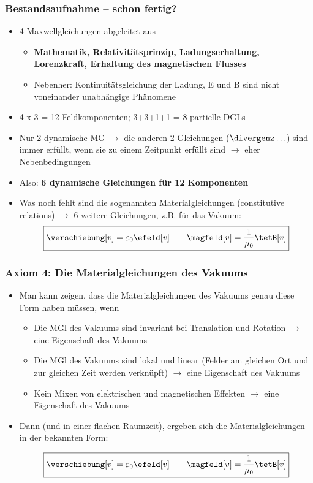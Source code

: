 \begin{frame}
  \frametitle{Bestandsaufnahme -- schon fertig?}
\begin{itemize}[<+->]
\item  4 Maxwellgleichungen abgeleitet aus
\begin{itemize}[<+->]
\item  \textbf{Mathematik, Relativitätsprinzip, Ladungserhaltung, Lorenzkraft, Erhaltung des magnetischen Flusses}
\item Nebenher: Kontinuitätsgleichung der Ladung, E und B sind nicht voneinander unabhängige Phänomene 
\end{itemize}
\item 4 x 3 = 12 Feldkomponenten; 3+3+1+1 = 8 partielle DGLs
\item Nur 2 dynamische MG \(\to\) die anderen 2 Gleichungen (\(\divergenz \ldots\)) sind immer erfüllt, wenn sie zu einem Zeitpunkt erfüllt sind \(\to\) eher Nebenbedingungen
\item Also: \textbf{6 dynamische Gleichungen für 12 Komponenten} 
\item Was noch fehlt sind die sogenannten Materialgleichungen (constitutive relations) \(\to\) 6 weitere Gleichungen, z.B. für das Vakuum:
  \begin{equation*}
    \boxed{\verschiebung[v] = \varepsilon_0\efeld[v] \qquad
    \magfeld[v] = \frac{1}{\mu_0} \tetB[v]}
    \end{equation*}
\end{itemize}
\end{frame}


\begin{frame}
  \frametitle{Axiom 4: Die Materialgleichungen des Vakuums}
\begin{itemize}[<+->]
\item  Man kann zeigen, dass die Materialgleichungen des Vakuums genau diese Form haben müssen, wenn

\begin{itemize}[<+->]
\item  Die MGl des Vakuums sind invariant bei Translation und Rotation \(\to\) eine Eigenschaft des Vakuums
\item Die MGl des Vakuums sind lokal und linear (Felder am gleichen Ort und zur gleichen Zeit werden verknüpft) \(\to\) eine Eigenschaft des Vakuums
\item Kein Mixen von elektrischen und magnetischen Effekten \(\to\) eine Eigenschaft des Vakuums
\end{itemize}
\item Dann (und in einer flachen Raumzeit), ergeben sich die Materialgleichungen in der bekannten Form:

  \begin{equation*}
    \boxed{\verschiebung[v] = \varepsilon_0\efeld[v] \qquad
    \magfeld[v] = \frac{1}{\mu_0} \tetB[v]}
    \end{equation*}
\end{itemize}
\end{frame}

